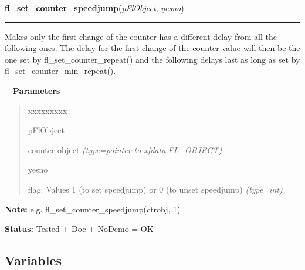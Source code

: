 \hspace{.8\funcindent}\begin{boxedminipage}{\funcwidth}

    \raggedright \textbf{fl\_set\_counter\_speedjump}(\textit{pFlObject}, \textit{yesno})

    \vspace{-1.5ex}

    \rule{\textwidth}{0.5\fboxrule}
\setlength{\parskip}{2ex}

Makes only the first change of the counter has a different delay
from all the following ones. The delay for the first change of the
counter value will then be the one set by fl\_set\_counter\_repeat()
and the following delays last as long as set by
fl\_set\_counter\_min\_repeat().

-{}-
\setlength{\parskip}{1ex}
      \textbf{Parameters}
      \vspace{-1ex}

      \begin{quote}
        \begin{Ventry}{xxxxxxxxx}

          \item[pFlObject]


counter object
            {\it (type=pointer to xfdata.FL\_OBJECT)}

          \item[yesno]


flag. Values 1 (to set speedjump) or 0 (to unset speedjump)
            {\it (type=int)}

        \end{Ventry}

      \end{quote}

\textbf{Note:} 
e.g. fl\_set\_counter\_speedjump(ctrobj, 1)


\textbf{Status:} 
Tested + Doc + NoDemo = OK


    \end{boxedminipage}



  \subsection{Variables}

